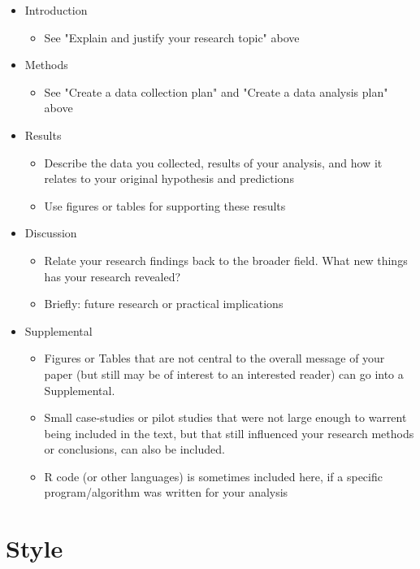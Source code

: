 \documentclass[11pt]{article}
\begin{document}
\begin{itemize}
\item Introduction
\begin{itemize}
  \item See "Explain and justify your research topic" above
\end{itemize}
\item Methods
\begin{itemize}
  \item See "Create a data collection plan" and "Create a data analysis plan" above
\end{itemize}
\item Results
\begin{itemize}
  \item Describe the data you collected, results of your analysis, and how it relates to your original hypothesis and predictions 
  \item Use figures or tables for supporting these results
\end{itemize}
\item Discussion
\begin{itemize}
  \item Relate your research findings back to the broader field. What new things has your research revealed?
  \item Briefly: future research or practical implications
\end{itemize}
\item Supplemental
\begin{itemize}
  \item Figures or Tables that are not central to the overall message of your paper (but still may be of interest to an interested reader) can go into a Supplemental.
  \item Small case-studies or pilot studies that were not large enough to warrent being included in the text, but that still influenced your research methods or conclusions, can also be included.
  \item R code (or other languages) is sometimes included here, if a specific program/algorithm was written for your analysis
\end{itemize}
\end{itemize}

\section*{Style}
\end{document}

